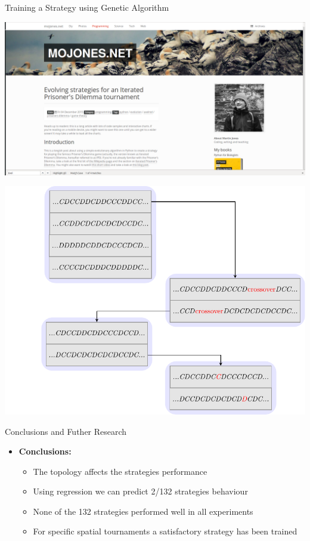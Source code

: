 \documentclass{beamer}
\begin{document}
\begin{frame}{Training a Strategy using Genetic Algorithm}
	\begin{center}
		\includegraphics[width=1\linewidth]{static/martin_jone_work.png}
	\end{center}
\end{frame}

\begin{frame}
	\begin{center}
		\includegraphics[width=1\linewidth]{static/genetic_algorithm_example.pdf}
	\end{center}
\end{frame}

\begin{frame}{Conclusions and Futher Research}
    \begin{itemize}
    \item \textbf{Conclusions:}
    \begin{itemize}[label={--}]
        \item The topology affects the strategies performance
        \item Using regression we can predict 2/132 strategies behaviour
        \item None of the 132 strategies performed well in all experiments
        \item For specific spatial tournaments a satisfactory strategy has been trained
    \end{itemize}
    \end{itemize}
\end{frame}
\end{document}
